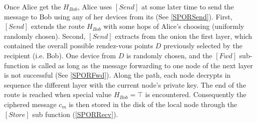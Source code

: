 
Once Alice get the \(H_{Bob}\), Alice uses \([Send]\) at some
later time to send the message to Bob using any of her devices from
its \squad (See \cref{SPORSend}). First, \([Send]\) extends the route
\(H_{Bob}\) with some hops of Alice's choosing (uniformly randomly
chosen). Second, \([Send]\) extracts from the onion the first
layer, which contained the overall
possible rendez-vous points $D$ previously selected by the recipient (i.e. Bob).
One device from $D$ is randomly chosen, and the \([Fwd]\)
sub-function is called as long as the message forwarding to one node of
the next layer is not successful (See \cref{SPORFwd}). Along the path, each node decrypts
in sequence the different layer with the current node’s private key. 
The end of the route is reached when special value \(H_{Bob} = \top\) is
encountered. Consequently the ciphered message \(c_m\) is then stored
in the disk of the local node through the \([Store]\) sub function 
(\cref{SPORRecv}).





 

